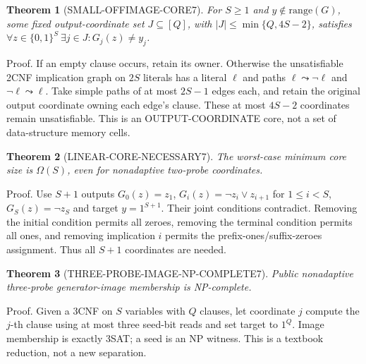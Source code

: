 \documentclass[11pt]{article}
\newtheorem{theorem}{Theorem}
\begin{document}
\begin{theorem}[SMALL-OFFIMAGE-CORE7]
For \(S\ge1\) and \(y\notin\mathrm{range}(G)\), some fixed output-coordinate set \(J\subseteq[Q]\), with \(|J|\le\min\{Q,4S-2\}\), satisfies \(\forall z\in\{0,1\}^S\ \exists j\in J: G_j(z)\ne y_j\).
\end{theorem}
\noindent Proof. If an empty clause occurs, retain its owner. Otherwise the unsatisfiable 2CNF implication graph on \(2S\) literals has a literal \(\ell\) and paths \(\ell\leadsto\neg\ell\) and \(\neg\ell\leadsto\ell\). Take simple paths of at most \(2S-1\) edges each, and retain the original output coordinate owning each edge's clause. These at most \(4S-2\) coordinates remain unsatisfiable. This is an OUTPUT-COORDINATE core, not a set of data-structure memory cells.
\begin{theorem}[LINEAR-CORE-NECESSARY7]
The worst-case minimum core size is \(\Omega(S)\), even for nonadaptive two-probe coordinates.
\end{theorem}
\noindent Proof. Use \(S+1\) outputs \(G_0(z)=z_1\), \(G_i(z)=\neg z_i\vee z_{i+1}\) for \(1\le i<S\), \(G_S(z)=\neg z_S\) and target \(y=1^{S+1}\). Their joint conditions contradict. Removing the initial condition permits all zeroes, removing the terminal condition permits all ones, and removing implication \(i\) permits the prefix-ones/suffix-zeroes assignment. Thus all \(S+1\) coordinates are needed.
\begin{theorem}[THREE-PROBE-IMAGE-NP-COMPLETE7]
Public nonadaptive three-probe generator-image membership is NP-complete.
\end{theorem}
\noindent Proof. Given a 3CNF on \(S\) variables with \(Q\) clauses, let coordinate \(j\) compute the \(j\)-th clause using at most three seed-bit reads and set target to \(1^Q\). Image membership is exactly 3SAT; a seed is an NP witness. This is a textbook reduction, not a new separation.
\end{document}
